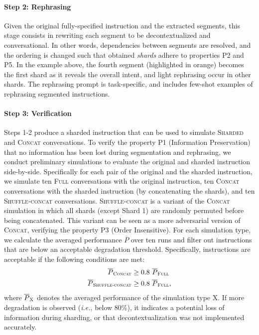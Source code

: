 \documentclass{article}
\newcommand{\fullt}{\textsc{Full}\xspace}
\newcommand{\concatt}{\textsc{Concat}\xspace}
\newcommand{\shardedt}{\textsc{Sharded}\xspace}
\begin{document}
\begin{appendices}
\paragraph{Step 2: Rephrasing} Given the original fully-specified instruction and the extracted segments, this stage consists in rewriting each segment to be decontextualized \cite{choi2021decontextualization} and conversational. In other words, dependencies between segments are resolved, and the ordering is changed such that obtained \textit{shards} adhere to properties P2 and P5. In the example above, the fourth segment (highlighted in orange) becomes the first shard as it reveals the overall intent, and light rephrasing occur in other shards. The rephrasing prompt is task-specific, and includes few-shot examples of rephrasing segmented instructions.

\paragraph{Step 3: Verification} Steps 1-2 produce a sharded instruction that can be used to simulate \shardedt and \concatt conversations. To verify the property P1 (Information Preservation) that no information has been lost during segmentation and rephrasing, we conduct preliminary simulations to evaluate the original and sharded instruction side-by-side. Specifically for each pair of the original and the sharded instruction, we simulate ten \fullt conversations with the original instruction, ten \concatt conversations with the sharded instruction (by concatenating the shards), and ten \textsc{Shuffle-concat} conversations. \textsc{Shuffle-concat} is a variant of the \concatt simulation in which all shards (except Shard 1) are randomly permuted before being concatenated. This variant can be seen as a more adversarial version of \concatt, verifying the property P3 (Order Insensitive). For each simulation type, we calculate the averaged performance $\overline{P}$ over ten runs and filter out instructions that are below an acceptable degradation threshold. Specifically, instructions are acceptable if the following conditions are met:
\begin{align*}
  \overline{P}_{\textsc{Concat}} &\geq 0.8~\overline{P}_{\textsc{Full}}\\
  \overline{P}_{\textsc{Shuffle-concat}} &\geq 0.8~\overline{P}_{\textsc{Full}},
\end{align*}
where $\overline{P}_{\textsc{X}}$ denotes the averaged performance of the simulation type \textsc{X}. If more degradation is observed (\textit{i.e.}, below 80\%), it indicates a potential loss of information during sharding, or that decontextualization was not implemented accurately.


\end{appendices}
\end{document}
